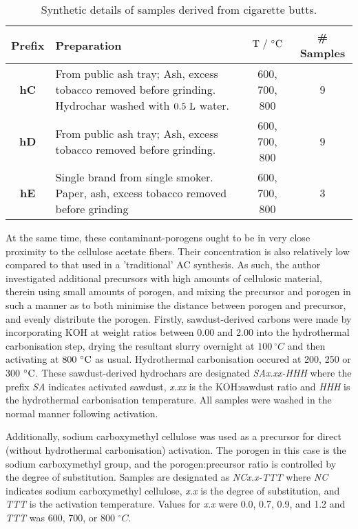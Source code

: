 \begin{table}[h]
\caption{Synthetic details of samples derived from cigarette butts.}
\label{tb:cb_synthesis}
\begin{tabularx}{\textwidth}{cXcc}
\toprule
\textbf{Prefix} & \textbf{Preparation} & \textbf{$\rm T\ /\ ^{\circ}C$} & \textbf{\# Samples} \\ 
\midrule
\textbf{hC}     & From public ash tray; Ash, excess tobacco removed before grinding. Hydrochar washed with $\rm 0.5\ L$ water.              & 600, 700, 800 & 9              \\
\textbf{hD}     &  From public ash tray; Ash, excess tobacco removed before grinding.             & 600, 700, 800 & 9             \\
\textbf{hE}     & Single brand from single smoker. Paper, ash, excess tobacco removed before grinding              & 600, 700, 800 & 3              \\
\bottomrule
\end{tabularx}%
\end{table}

At the same time, these contaminant-porogens ought to be in very close proximity to the cellulose acetate fibers. Their concentration is also relatively low compared to that used in a 'traditional' AC synthesis. As such, the author investigated additional precursors with high amounts of cellulosic material, therein using small amounts of porogen, and mixing the precursor and porogen in such a manner as to both minimise the distance between porogen and precursor, and evenly distribute the porogen. Firstly, sawdust-derived carbons were made by incorporating KOH at weight ratios between 0.00 and 2.00 into the hydrothermal carbonisation step, drying the resultant slurry overnight at $100\  ^{\circ}C$ and then activating at $\rm 800\ ^{\circ}C$ as usual. Hydrothermal carbonisation occured at 200, 250 or 300 $\rm ^{\circ}C$. These sawdust-derived hydrochars are designated \textit{SAx.xx-HHH} where the prefix \textit{SA} indicates activated sawdust, \textit{x.xx} is the KOH:sawdust ratio and \textit{HHH} is the hydrothermal carbonisation temperature. All samples were washed in the normal manner following activation.

Additionally, sodium carboxymethyl cellulose was used as a precursor for direct (without hydrothermal carbonisation) activation. The porogen in this case is the sodium carboxymethyl group, and the porogen:precursor ratio is controlled by the degree of substitution. Samples are designated as \textit{NCx.x-TTT} where \textit{NC} indicates sodium carboxymethyl cellulose, \textit{x.x} is the degree of substitution, and \textit{TTT} is the activation temperature. Values for \textit{x.x} were 0.0, 0.7, 0.9, and 1.2 and \textit{TTT} was 600, 700, or 800 $^{\circ}C$.


